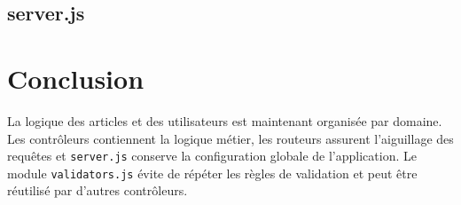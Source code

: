 \documentclass[12pt,a4paper]{article}
\begin{document}


\subsection{server.js}



\section{Conclusion}

La logique des articles et des utilisateurs est maintenant organisée par domaine. Les contrôleurs
contiennent la logique métier, les routeurs assurent l'aiguillage des requêtes et \texttt{server.js}
conserve la configuration globale de l'application. Le module \texttt{validators.js} évite de
répéter les règles de validation et peut être réutilisé par d'autres contrôleurs.
\end{document}
